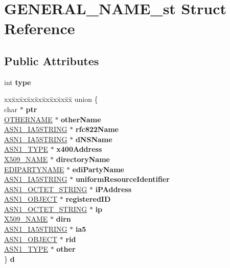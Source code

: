 \hypertarget{struct_g_e_n_e_r_a_l___n_a_m_e__st}{}\section{G\+E\+N\+E\+R\+A\+L\+\_\+\+N\+A\+M\+E\+\_\+st Struct Reference}
\label{struct_g_e_n_e_r_a_l___n_a_m_e__st}
\subsection*{Public Attributes}
\begin{DoxyCompactItemize}
\item 
\mbox{\label{struct_g_e_n_e_r_a_l___n_a_m_e__st_adee285a4ad25557f12d51af03e1cf0e2}} 
int {\bfseries type}
\item 
\mbox{\label{struct_g_e_n_e_r_a_l___n_a_m_e__st_a1fecb27fea72d75505fd4990c29a19cf}} 
\begin{tabbing}
xx\=xx\=xx\=xx\=xx\=xx\=xx\=xx\=xx\=\kill
union \{\\
\>char $\ast$ {\bfseries ptr}\\
\>\hyperlink{structother_name__st}{OTHERNAME} $\ast$ {\bfseries otherName}\\
\>\hyperlink{structasn1__string__st}{ASN1\_IA5STRING} $\ast$ {\bfseries rfc822Name}\\
\>\hyperlink{structasn1__string__st}{ASN1\_IA5STRING} $\ast$ {\bfseries dNSName}\\
\>\hyperlink{structasn1__type__st}{ASN1\_TYPE} $\ast$ {\bfseries x400Address}\\
\>\hyperlink{struct_x509__name__st}{X509\_NAME} $\ast$ {\bfseries directoryName}\\
\>\hyperlink{struct_e_d_i_party_name__st}{EDIPARTYNAME} $\ast$ {\bfseries ediPartyName}\\
\>\hyperlink{structasn1__string__st}{ASN1\_IA5STRING} $\ast$ {\bfseries uniformResourceIdentifier}\\
\>\hyperlink{structasn1__string__st}{ASN1\_OCTET\_STRING} $\ast$ {\bfseries iPAddress}\\
\>\hyperlink{structasn1__object__st}{ASN1\_OBJECT} $\ast$ {\bfseries registeredID}\\
\>\hyperlink{structasn1__string__st}{ASN1\_OCTET\_STRING} $\ast$ {\bfseries ip}\\
\>\hyperlink{struct_x509__name__st}{X509\_NAME} $\ast$ {\bfseries dirn}\\
\>\hyperlink{structasn1__string__st}{ASN1\_IA5STRING} $\ast$ {\bfseries ia5}\\
\>\hyperlink{structasn1__object__st}{ASN1\_OBJECT} $\ast$ {\bfseries rid}\\
\>\hyperlink{structasn1__type__st}{ASN1\_TYPE} $\ast$ {\bfseries other}\\
\} {\bfseries d}\\

\end{tabbing}\end{DoxyCompactItemize}


